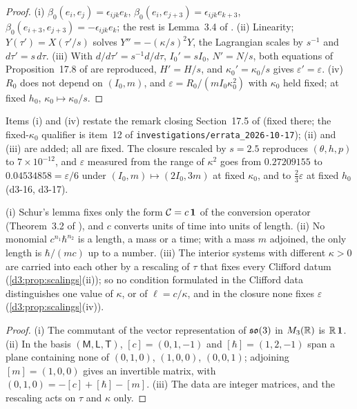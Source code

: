 \begin{proof}
(i) $\beta_0(e_i,e_j)=\epsilon_{ijk}e_k$, $\beta_0(e_i,e_{j+3})=\epsilon_{ijk}e_{k+3}$, $\beta_0(e_{i+3},e_{j+3})=-\epsilon_{ijk}e_k$; the rest is Lemma~3.4 of
\cite{ES17}. (ii) Linearity; $Y(\tau')=X(\tau'/s)$ solves $Y''=-(\kappa/s)^2Y$, the Lagrangian scales by $s^{-1}$ and $d\tau'=s\,d\tau$. (iii) With
$d/d\tau'=s^{-1}d/d\tau$, $I_0'=sI_0$, $N'=N/s$, both equations of Proposition~17.8 of \cite{ES17} are reproduced, $H'=H/s$, and $\kappa_0'=\kappa_0/s$ gives
$\varepsilon'=\varepsilon$. (iv) $R_0$ does not depend on $(I_0,m)$, and $\varepsilon=R_0/(mI_0\kappa_0^2)$ with $\kappa_0$ held fixed; at fixed $h_0$,
$\kappa_0\mapsto\kappa_0/s$.
\end{proof}

Items (i) and (iv) restate the remark closing Section~17.5 of \cite{ES17} (fixed there; the fixed-$\kappa_0$ qualifier is item~12 of
\texttt{investigations/errata\_2026-10-17}); (ii) and (iii) are added; all are fixed. The closure rescaled by $s=2.5$ reproduces $(\theta,h,p)$ to
$7\times10^{-12}$, and $\varepsilon$ measured from the range of $\kappa^2$ goes from $0.27209155$ to $0.04534858=\varepsilon/6$ under
$(I_0,m)\mapsto(2I_0,3m)$ at fixed $\kappa_0$, and to $\tfrac23\varepsilon$ at fixed $h_0$ (d3-16, d3-17).

\begin{proposition}
\label{d3:thm:noscale}
(i) Schur's lemma \cite{Schur} fixes only the form $\mathcal C=c\,\mathbf 1$ of the conversion operator (Theorem~3.2 of \cite{ES17}), and $c$ converts units of time into
units of length. (ii) No monomial $c^{n_1}\hbar^{n_2}$ is a length, a mass or a time; with a mass $m$ adjoined, the only length is $\hbar/(mc)$ up to a
number. (iii) The interior systems with different $\kappa>0$ are carried into each other by a rescaling of $\tau$ that fixes every Clifford datum
(\cref{d3:prop:scalings}(ii)); so no condition formulated in the Clifford data distinguishes one value of $\kappa$, or of $\ell=c/\kappa$, and in the
closure none fixes $\varepsilon$ (\cref{d3:prop:scalings}(iv)).
\end{proposition}

\begin{proof}
(i) The commutant of the vector representation of $\mathfrak{so}(3)$ in $M_3(\mathbb{R})$ is $\mathbb{R}\,\mathbf 1$. (ii) In the basis $(\mathsf M,\mathsf L,\mathsf T)$,
$[c]=(0,1,-1)$ and $[\hbar]=(1,2,-1)$ span a plane containing none of $(0,1,0)$, $(1,0,0)$, $(0,0,1)$; adjoining $[m]=(1,0,0)$ gives an invertible
matrix, with $(0,1,0)=-[c]+[\hbar]-[m]$. (iii) The data are integer matrices, and the rescaling acts on $\tau$ and $\kappa$ only.
\end{proof}

